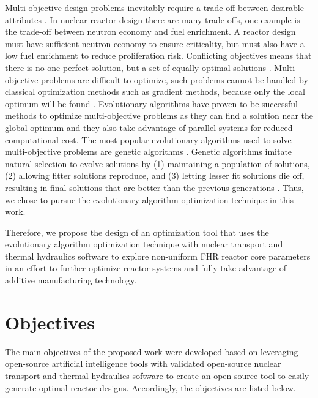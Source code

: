 Multi-objective design problems inevitably require a trade off between 
desirable attributes \cite{byrne_evolving_2014,simon_sciences_2019}. 
In nuclear reactor design there are many trade offs, one example is the 
trade-off between neutron economy and fuel enrichment. 
A reactor design must have sufficient neutron economy to ensure criticality, 
but must also have a low fuel enrichment to reduce proliferation risk.
Conflicting objectives means that there is no one perfect solution, but a set
of equally optimal solutions \cite{byrne_evolving_2014}.
Multi-objective problems are difficult to optimize, such problems 
cannot be handled by classical optimization methods such as gradient 
methods, because only the local optimum will be found \cite{renner_genetic_2003}. 
Evolutionary algorithms have proven to be successful 
methods to optimize multi-objective problems \cite{krish_practical_2011} as 
they can find a solution near the global optimum \cite{renner_genetic_2003}
and they also take advantage of parallel systems for reduced computational 
cost. 
The most popular evolutionary algorithms used to solve multi-objective 
problems are genetic algorithms 
\cite{byrne_evolving_2014, krish_practical_2011}. 
Genetic algorithms imitate natural selection to evolve solutions 
by (1) maintaining a population of solutions, (2) allowing 
fitter solutions reproduce, and (3) letting lesser fit solutions die off, 
resulting in final solutions that are better than the previous generations 
\cite{renner_genetic_2003}. 
Thus, we chose to pursue the evolutionary algorithm optimization technique 
in this work. 

Therefore, we propose the design of an optimization tool that uses the evolutionary 
algorithm optimization technique with nuclear transport and thermal hydraulics 
software to explore non-uniform \gls{FHR} reactor core parameters in an effort to 
further optimize reactor systems and fully take advantage of additive manufacturing 
technology.  


\section{Objectives}
The main objectives of the proposed work were developed based on leveraging open-source 
artificial intelligence tools with validated open-source nuclear transport and 
thermal hydraulics software to create an open-source tool to easily generate 
optimal reactor designs. 
Accordingly, the objectives are listed below. 
\vspace{0.2cm} 

